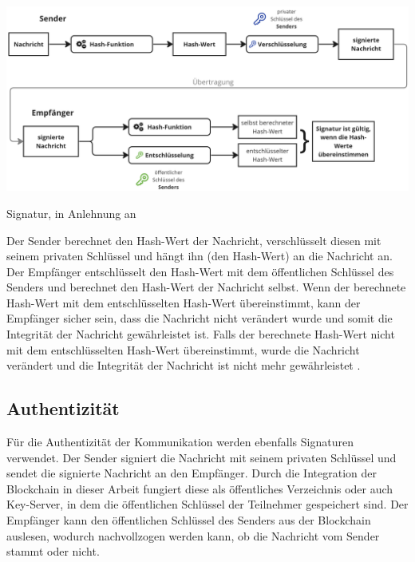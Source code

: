 \begin{center}
    \captionsetup{type=figure}
    \includegraphics[width=1\linewidth]{images/signatur.png}
    \caption{Signatur, in Anlehnung an \cite{DocuSign_digitaleSignaturen}}
    \label{fig:signatur}
\end{center}

\noindent Der Sender berechnet den Hash-Wert der Nachricht, verschlüsselt diesen mit seinem privaten Schlüssel und hängt ihn (den Hash-Wert) an die Nachricht an. Der Empfänger entschlüsselt den Hash-Wert mit dem öffentlichen Schlüssel des Senders und berechnet den Hash-Wert der Nachricht selbst. Wenn der berechnete Hash-Wert mit dem entschlüsselten Hash-Wert übereinstimmt, kann der Empfänger sicher sein, dass die Nachricht nicht verändert wurde und somit die Integrität der Nachricht gewährleistet ist. Falls der berechnete Hash-Wert nicht mit dem entschlüsselten Hash-Wert übereinstimmt, wurde die Nachricht verändert und die Integrität der Nachricht ist nicht mehr gewährleistet \Parencite[S. 73-78]{Hellmann_IT-Sicherheit}. 


\subsection{Authentizität}

Für die Authentizität der Kommunikation werden ebenfalls Signaturen verwendet. Der Sender signiert die Nachricht mit seinem privaten Schlüssel und sendet die signierte Nachricht an den Empfänger. Durch die Integration der Blockchain in dieser Arbeit fungiert diese als öffentliches Verzeichnis oder auch Key-Server, in dem die öffentlichen Schlüssel der Teilnehmer gespeichert sind. Der Empfänger kann den öffentlichen Schlüssel des Senders aus der Blockchain auslesen, wodurch nachvollzogen werden kann, ob die Nachricht vom Sender stammt oder nicht.